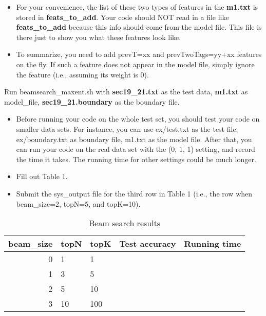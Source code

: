 \documentclass[11pt]{article}
\begin{document}
\begin{itemize}
\begin{itemize}
       \item For your convenience, the list of these two types of features 
        in the {\bf m1.txt} is stored in {\bf feats\_to\_add}. 
        Your code should NOT read in a file like {\bf feats\_to\_add}
        because this info should come from the model file. 
        This file is there just to show you what these features look like.

      \item To summarize, you need to add prevT=xx and
        prevTwoTags=yy+xx features on the fly.
        If such a feature does not appear in the model
        file,  simply ignore the feature (i.e., assuming its weight is 0).
    \end{itemize}

\end{itemize}

        
\noindent
Run beamsearch\_maxent.sh with 
      {\bf sec19\_21.txt} as the test data,  {\bf m1.txt} as model\_file,
      {\bf sec19\_21.boundary} as the boundary file. 
\begin{itemize}
\item Before running your code on the whole test set,
  you should test your code on smaller data sets.
  For instance, you can use ex/test.txt as the test file,
  ex/boundary.txt as boundary file,
  m1.txt as the model file.
  After that, you can run your code on the real data set with the (0, 1, 1)
  setting, and record the time it takes.
  The running time for other settings could be much longer.

    \item Fill out Table 1.
    \item Submit the sys\_output file for the third row in Table 1
          (i.e., the row when beam\_size=2, topN=5, and topK=10).
\end{itemize}


\begin{table}[h]
\centering
\begin{tabular}{|r|l|l|l|l|} \hline
beam\_size & topN  & topK  & Test accuracy  & Running time \\  \hline
0          & 1     & 1     &    & \\ \hline
1          & 3     & 5     &    & \\ \hline
2          & 5     & 10    &    &  \\ \hline
3          & 10    & 100   &    &  \\ \hline 
\end{tabular}
\caption{Beam search results}
\label{table1}
\end{table}
\end{document}
